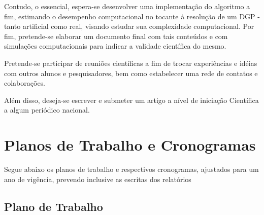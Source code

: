 \documentclass[11pt]{article}
\begin{document}
Contudo, o essencial, espera-se desenvolver uma implementação do algoritmo a fim, estimando o desempenho computacional no tocante à resolução de um DGP - tanto artificial como real, visando estudar sua complexidade computacional. Por fim, pretende-se elaborar um documento final com tais conteúdos e com simulações computacionais para indicar a validade científica do mesmo.

Pretende-se participar de reuniões científicas a fim de trocar experiências e idéias com outros alunos e pesquisadores, bem como estabelecer uma rede de contatos e colaborações.

Além disso, deseja-se escrever e submeter um artigo a nível de iniciação Científica a algum periódico nacional.

\section{Planos de Trabalho e Cronogramas}

Segue abaixo os planos de trabalho e respectivos cronogramas, ajustados para um ano de vigência, prevendo inclusive as escritas dos relatórios
	
	\subsection{Plano de Trabalho}
	
\end{document}
